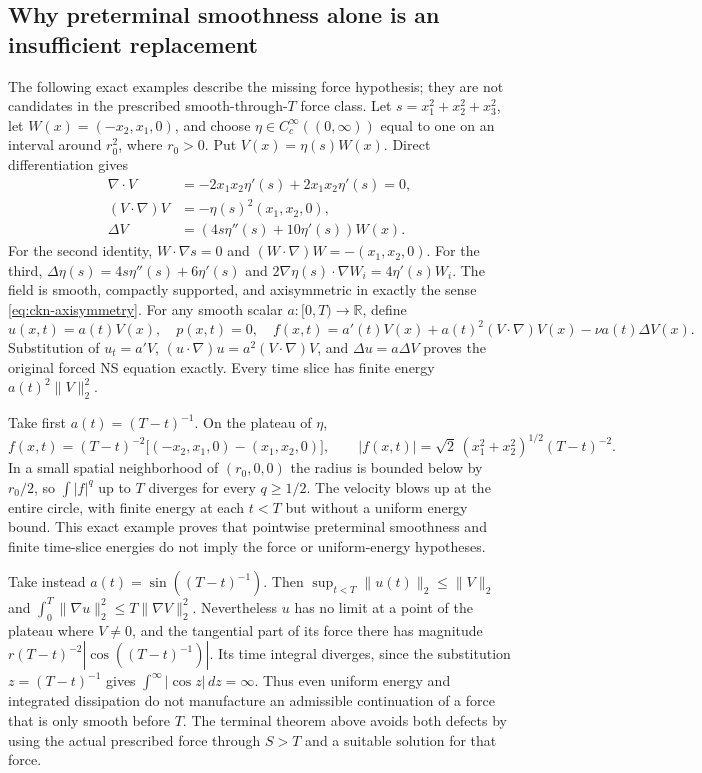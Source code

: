 \subsection{Why preterminal smoothness alone is an insufficient replacement}

The following exact examples describe the missing force hypothesis;
they are not candidates in the prescribed smooth-through-$T$ force class.
Let $s=x_1^2+x_2^2+x_3^2$, let
$W(x)=(-x_2,x_1,0)$, and choose
$\eta\in C_c^\infty((0,\infty))$ equal to one on an interval around
$r_0^2$, where $r_0>0$. Put $V(x)=\eta(s)W(x)$.
Direct differentiation gives
\begin{align}\label{eq:ckn-example-field}
 \nabla\cdot V&=-2x_1x_2\eta'(s)+2x_1x_2\eta'(s)=0,\nonumber\\
 (V\cdot\nabla)V&=-\eta(s)^2(x_1,x_2,0),\nonumber\\
 \Delta V&=(4s\eta''(s)+10\eta'(s))W(x).
\end{align}
For the second identity, $W\cdot\nabla s=0$ and
$(W\cdot\nabla)W=-(x_1,x_2,0)$.
For the third, $\Delta\eta(s)=4s\eta''(s)+6\eta'(s)$ and
$2\nabla\eta(s)\cdot\nabla W_i=4\eta'(s)W_i$.
The field is smooth, compactly supported, and axisymmetric in exactly
the sense \eqref{eq:ckn-axisymmetry}.
For any smooth scalar $a:[0,T)\to\mathbb R$, define
\begin{equation}\label{eq:ckn-example-solution}
 u(x,t)=a(t)V(x),\quad p(x,t)=0,\quad
 f(x,t)=a'(t)V(x)+a(t)^2(V\cdot\nabla)V(x)-\nu a(t)\Delta V(x).
\end{equation}
Substitution of $u_t=a'V$, $(u\cdot\nabla)u=a^2(V\cdot\nabla)V$,
and $\Delta u=a\Delta V$ proves the original forced NS equation exactly.
Every time slice has finite energy $a(t)^2\|V\|_2^2$.

Take first $a(t)=(T-t)^{-1}$. On the plateau of $\eta$,
\begin{equation}\label{eq:ckn-example-force}
 f(x,t)=(T-t)^{-2}\big[(-x_2,x_1,0)-(x_1,x_2,0)\big],
 \qquad |f(x,t)|=\sqrt2\,(x_1^2+x_2^2)^{1/2}(T-t)^{-2}.
\end{equation}
In a small spatial neighborhood of $(r_0,0,0)$ the radius is bounded
below by $r_0/2$, so $\int|f|^q$ up to $T$ diverges for every
$q\geq1/2$. The velocity blows up at the entire circle, with finite
energy at each $t<T$ but without a uniform energy bound. This exact
example proves that pointwise preterminal smoothness and finite
time-slice energies do not imply the force or uniform-energy hypotheses.

Take instead $a(t)=\sin((T-t)^{-1})$. Then
$\sup_{t<T}\|u(t)\|_2\leq\|V\|_2$ and
$\int_0^T\|\nabla u\|_2^2\leq T\|\nabla V\|_2^2$.
Nevertheless $u$ has no limit at a point of the plateau where $V\ne0$,
and the tangential part of its force there has magnitude
$r(T-t)^{-2}|\cos((T-t)^{-1})|$. Its time integral diverges, since the
substitution $z=(T-t)^{-1}$ gives
$\int^\infty|\cos z|\,dz=\infty$.
Thus even uniform energy and integrated dissipation do not manufacture
an admissible continuation of a force that is only smooth before $T$.
The terminal theorem above avoids both defects by using the actual
prescribed force through $S>T$ and a suitable solution for that force.

